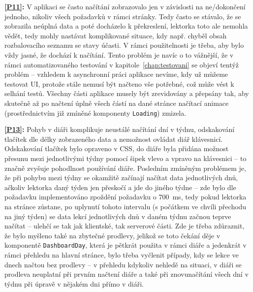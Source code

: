 \textbf{\ref{P11}:} V aplikaci se často načítání zobrazovalo jen v závislosti na ne/dokončení jednoho, nikoliv všech požadavků v rámci stránky. Tedy často se stávalo, že se zobrazila neúplná data a poté docházelo k překreslení, lektorka toto ale nemohla vědět, tedy mohly nastávat komplikované situace, kdy např. chyběl obsah rozbalovacího seznamu se stavy účasti. V rámci použitelnosti je třeba, aby bylo vždy jasné, že dochází k načítání. Tento problém je navíc o to vážnější, že v rámci automatizovaného testování v kapitole~\ref{chap:testovani} se objeví tentýž problém -- vzhledem k asynchronní práci aplikace nevíme, kdy už můžeme testovat UI, protože stále nemusí být načteno vše potřebné, což může vést k selhání testů. Všechny části aplikace musely být zrevidovány a přepsány tak, aby skutečně až po načtení úplně všech částí na dané stránce načítací animace (prostřednictvím již zmíněné komponenty \verb|Loading|) zmizela.

\textbf{\ref{P13}:} Pohyb v diáři komplikuje neustálé načítání dní v týdnu, odskakování tlačítek dle délky zobrazeného data a nemožnost ovládat diář klávesnicí. Odskakování tlačítek bylo opraveno v CSS, do diáře byla přidána možnost přesunu mezi jednotlivými týdny pomocí šipek vlevo a vpravo na klávesnici -- to značně zvyšuje pohodlnost používání diáře. Posledním zmíněným problémem je, že při pohybu mezi týdny se okamžitě začínají načítat data jednotlivých dnů, ačkoliv lektorka daný týden jen přeskočí a jde do jiného týdne -- zde bylo dle požadavku implementováno zpoždění požadavku o 700~ms, tedy pokud lektorka na stránce zůstane, po uplynutí tohoto intervalu (s počátkem ve chvíli přechodu na jiný týden) se data lekcí jednotlivých dnů v daném týdnu začnou teprve načítat -- ulehčí se tak jak klientské, tak serverové části. Zde je třeba zdůraznit, že bylo myšleno také na zbytečné prodlevy, jelikož se toto čekání děje v komponentě \verb|DashboardDay|, která je pětkrát použita v rámci diáře a jedenkrát v rámci přehledu na hlavní stránce, bylo třeba vyčlenit případy, kdy se lekce ve dnech načtou bez prodlevy -- v přehledu kdykoliv nehledě na situaci, v diáři se prodleva neuplatní při prvním načtení diáře a také při znovunačítání všech dní v týdnu při úpravě v nějakém dni přímo v diáři.

